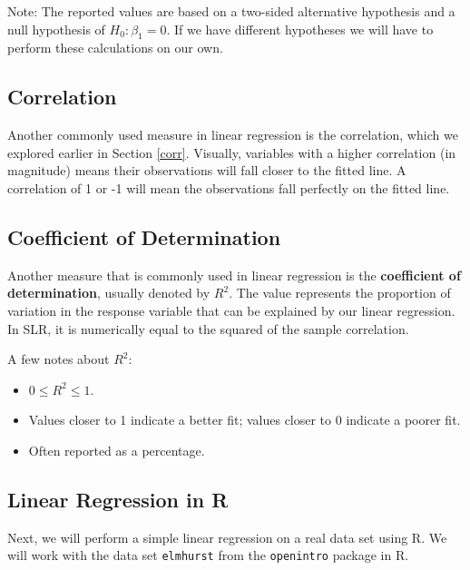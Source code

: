 \documentclass[
]{book}
\providecommand{\tightlist}{%
  \setlength{\itemsep}{0pt}\setlength{\parskip}{0pt}}
\begin{document}
Note: The reported values are based on a two-sided alternative hypothesis and a null hypothesis of \(H_0: \beta_1 = 0\). If we have different hypotheses we will have to perform these calculations on our own.

\hypertarget{correlation}{%
\subsection{Correlation}\label{correlation}}

Another commonly used measure in linear regression is the correlation, which we explored earlier in Section \ref{corr}. Visually, variables with a higher correlation (in magnitude) means their observations will fall closer to the fitted line. A correlation of 1 or -1 will mean the observations fall perfectly on the fitted line.

\hypertarget{coefficient-of-determination}{%
\subsection{Coefficient of Determination}\label{coefficient-of-determination}}

Another measure that is commonly used in linear regression is the \textbf{coefficient of determination}, usually denoted by \(R^2\). The value represents the proportion of variation in the response variable that can be explained by our linear regression. In SLR, it is numerically equal to the squared of the sample correlation.

A few notes about \(R^2\):

\begin{itemize}
\tightlist
\item
  \(0 \leq R^2 \leq 1\).
\item
  Values closer to 1 indicate a better fit; values closer to 0 indicate a poorer fit.
\item
  Often reported as a percentage.
\end{itemize}

\hypertarget{linear-regression-in-r}{%
\subsection{Linear Regression in R}\label{linear-regression-in-r}}

Next, we will perform a simple linear regression on a real data set using R. We will work with the data set \texttt{elmhurst} from the \texttt{openintro} package in R.
\end{document}
